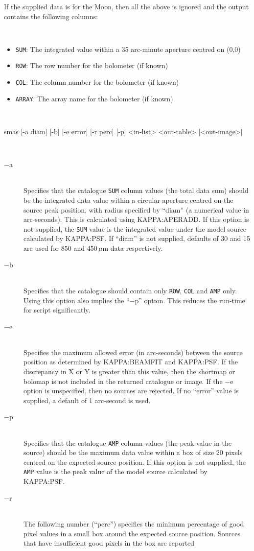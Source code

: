 \documentclass[twoside,11pt]{article}
\renewcommand{\_}{\texttt{\symbol{95}}}
\newcommand{\sstusage}[1]{\item[Usage:] \mbox{}
\\[1.3ex]{\raggedright \ssttt #1}}
\newcommand{\sstparameters}[1]{
   \item[Parameters:] \mbox{} \\
   \vspace{-3.5ex}
   \begin{description}
      #1
   \end{description}
}
\newcommand{\sstsubsection}[1]{ \item[{#1}] \mbox{} \\}
\newcommand{\sstitemlist}[1]{
  \mbox{} \\
  \vspace{-3.5ex}
  \begin{itemize}
     #1
  \end{itemize}
}
\newcommand{\sstitem}{\item}
\newcommand{\sstusage}[1]{\item[Usage:]
      \begin{description}
         {\ssttt #1}
      \end{description}
      \\
   }
\newcommand{\sstparameters}[1]{
      \item[Parameters:] \\
      \begin{description}
         #1
      \end{description}
      \\
   }
\newcommand{\sstsubsection}[1]{\item[{#1}]}
\newcommand{\sstitemlist}[1]{
      \begin{itemize}
         #1
      \end{itemize}
      \\
   }
\newcommand{\sstitem}{\item}
\begin{document}
{{    If the supplied data is for the Moon, then all the above is
    ignored and the output contains the following columns:

    \sstitemlist{
      \sstitem \texttt{SUM}: The integrated value within a 35 arc-minute aperture
      centred on (0,0)
      \sstitem \texttt{ROW}: The row number for the bolometer (if known)
      \sstitem \texttt{COL}: The column number for the bolometer (if known)
      \sstitem \texttt{ARRAY}: The array name for the bolometer (if known)
    }
  }
  \sstusage{
    smas [-a diam] [-b] [-e error] [-r perc] [-p] <in-list> <out-table> [<out-image>]
  }
  \sstparameters{
    \sstsubsection{
      $-$a
    }{
      Specifies that the catalogue \texttt{SUM} column values (the total
      data sum) should be the integrated data value within a
      circular aperture centred on the source peak position,
      with radius specified by ``diam'' (a numerical value in
      arc-seconds). This is calculated using KAPPA:APERADD.
      If this option is not supplied, the \texttt{SUM} value is the
      integrated value under the model source calculated by
      KAPPA:PSF. If ``diam'' is not supplied, defaults of 30 and
      15 are used for 850 and 450\,$\mu$m data respectively.
    }
    \sstsubsection{
      $-$b
    }{
      Specifies that the catalogue should contain only \texttt{ROW}, \texttt{COL} and
      \texttt{AMP} only. Using this option also implies the ``$-$p'' option.
      This reduces the run-time for script significantly.
    }
    \sstsubsection{
      $-$e
    }{
      Specifies the maximum allowed error (in arc-seconds) between the
      source position as determined by KAPPA:BEAMFIT and KAPPA:PSF.
      If the discrepancy in X or Y is greater than this value, then
      the shortmap or bolomap is not included in the returned catalogue
      or image. If the $-$e option is unspecified, then no sources are
      rejected. If no ``error'' value is supplied, a default of 1
      arc-second is used.
    }
    \sstsubsection{
      $-$p
    }{
      Specifies that the catalogue \texttt{AMP} column values (the peak
      value in the source) should be the maximum data value within
      a box of size 20 pixels centred on the expected source position.
      If this option is not supplied, the \texttt{AMP} value is the peak value
      of the model source calculated by KAPPA:PSF.
    }
    \sstsubsection{
      $-$r
    }{
      The following number (``perc'') specifies the minimum percentage of
      good pixel values in a small box around the expected source position.
      Sources that have insufficient good pixels in the box are reported
}}}
\end{document}
